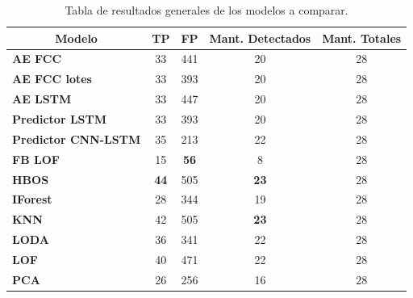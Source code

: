 \begin{table}[H]
	\centering
	\begin{tabular}{|l|c|c|c|c|}
		\hline
		\multicolumn{1}{|c|}{\textbf{Modelo}} & \textbf{TP} & \textbf{FP} & \textbf{Mant. Detectados} & \textbf{Mant. Totales} \\ \hline
		\textbf{AE FCC}                       & 33          & 441         & 20                                 & 28                              \\ \hline
		\textbf{AE FCC lotes}                 & 33          & 393         & 20                                 & 28                              \\ \hline
		\textbf{AE LSTM}                      & 33          & 447         & 20                                 & 28                              \\ \hline
		\textbf{Predictor LSTM}               & 33          & 393         & 20                                 & 28                              \\ \hline
		\textbf{Predictor CNN-LSTM}           & 35          & 213         & 22                                 & 28                              \\ \hline
		\textbf{FB LOF}                       & 15          & \textbf{56} & 8                                  & 28                              \\ \hline
		\textbf{HBOS}                         & \textbf{44} & 505         & \textbf{23}                        & 28                              \\ \hline
		\textbf{IForest}                      & 28          & 344         & 19                                 & 28                              \\ \hline
		\textbf{KNN}                          & 42          & 505         & \textbf{23}                        & 28                              \\ \hline
		\textbf{LODA}                         & 36          & 341         & 22                                 & 28                              \\ \hline
		\textbf{LOF}                          & 40          & 471         & 22                                 & 28                              \\ \hline
		\textbf{PCA}                          & 26          & 256         & 16                                 & 28                              \\ \hline
	\end{tabular}
	\caption{Tabla de resultados generales de los modelos a comparar.}
	\label{tabla:resultados1}
\end{table}

